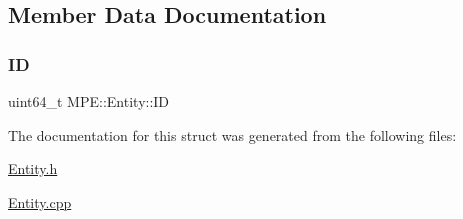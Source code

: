 \subsection{Member Data Documentation}
\mbox{\label{struct_m_p_e_1_1_entity_a04ff49ec80c37388b0e6a75cec860ceb}} 
\subsubsection{\texorpdfstring{ID}{ID}}
{\footnotesize\ttfamily uint64\+\_\+t M\+P\+E\+::\+Entity\+::\+ID}



The documentation for this struct was generated from the following files\+:\begin{DoxyCompactItemize}
\item 
\hyperlink{_entity_8h}{Entity.\+h}\item 
\hyperlink{_entity_8cpp}{Entity.\+cpp}\end{DoxyCompactItemize}
